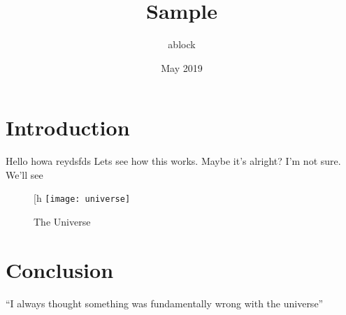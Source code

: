\documentclass{article}
\title{Sample}
\author{ablock }
\date{May 2019}
\begin{document}
\maketitle

\section{Introduction}
Hello howa reydsfds Lets see how this works. Maybe it's alright? I'm not sure. We'll see

\begin{figure}[h
\centering
\texttt{[image: universe]}
\caption{The Universe}
\label{fig:universe}
\end{figure}

\section{Conclusion}
``I always thought something was fundamentally wrong with the universe'' \citep{adams1995hitchhiker}



\end{document}
